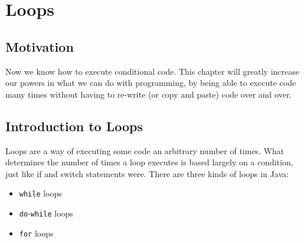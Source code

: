 \section{Loops}

\subsection{Motivation}
Now we know how to execute conditional code. This chapter will greatly increase our powers in what we can do with programming, by being able to execute code many times without having to re-write (or copy and paste) code over and over.

\subsection{Introduction to Loops}
Loops are a way of executing some code an arbitrary number of times. What determines the number of times a loop executes is based largely on a condition, just like if and switch statements were. There are three kinds of loops in Java:
\begin{itemize}
\item \verb|while| loops
\item \verb|do|-\verb|while| loops
\item \verb|for| loops
\end{itemize}

